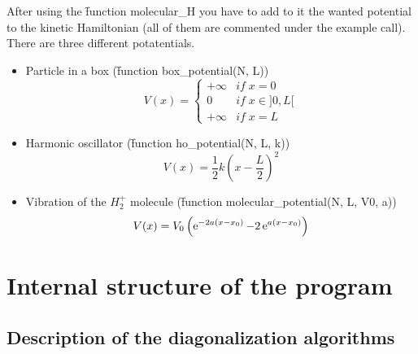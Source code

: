 \documentclass[1pt, a4paper]{article}
\begin{document}
After using the \f{function molecular_H} you have to add to it the wanted potential to the kinetic Hamiltonian (all of them are commented under the example call). There are three different potatentials.
\begin{itemize}[leftmargin=15pt, itemsep=0pt, topsep=0pt]
    \item Particle in a box (\f{function box_potential(N, L)})
        \begin{equation}
            V(x) = \left\{\begin{array}{ll}
                            +\infty&if\;x=0\\
                            0\;\quad&if\;x\in ]0,L[\\
                            +\infty&if\;x=L
                          \end{array}\right.
        \end{equation}
    \item Harmonic oscillator (\f{function ho_potential(N, L, k)})
        \begin{equation}
            V(x) = \dfrac{1}{2}k\left(x - \dfrac{L}{2}\right)^2
        \end{equation}
    \item Vibration of the $H_2^+$ molecule (\f{function molecular_potential(N, L, V0, a)})
        \begin{equation}
            V(x) = V_0\left(\operatorname{e}^{-2a(x-x_0)} - 2\operatorname{e}^{a(x-x_0)}\right)
        \end{equation}
\end{itemize}
\newpage
\section{Internal structure of the program}
\label{sec:3}
\noindent
\subsection{Description of the diagonalization algorithms}
\label{sub:diag}
\noindent
\end{document}
